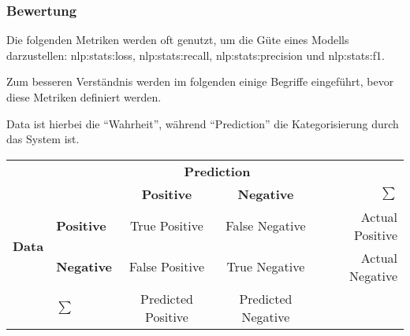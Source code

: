 

\subsubsection{Bewertung }
Die folgenden Metriken werden oft genutzt,
um die Güte eines Modells darzustellen:
\gls{nlp:stats:loss},
\gls{nlp:stats:recall},
\gls{nlp:stats:precision} und
\gls{nlp:stats:f1}.

Zum besseren Verständnis werden im folgenden einige Begriffe eingeführt,
bevor diese Metriken definiert werden.
\begin{defn}
	Data ist hierbei die \enquote{Wahrheit},
	während \enquote{Prediction} die Kategorisierung durch das System ist.
	\begin{center}
		\begin{tabularx}{0.8\textwidth}{l l | c c | r}
			                               &                   & \multicolumn{2}{c|}{\textbf{Prediction}} &                                      \\
			                               &                   & \textbf{Positive}                        & \textbf{Negative}  & $\sum$          \\
			\cline{1-5}
			\multirow{2}{*}{\textbf{Data}} & \textbf{Positive} & True Positive                            & False Negative     & Actual Positive \\
			                               & \textbf{Negative} & False Positive                           & True Negative      & Actual Negative \\
			\cline{1-5}
			                               & $\sum$            & Predicted Positive                       & Predicted Negative &
		\end{tabularx}
	\end{center}
\end{defn}
\FloatBarrier

